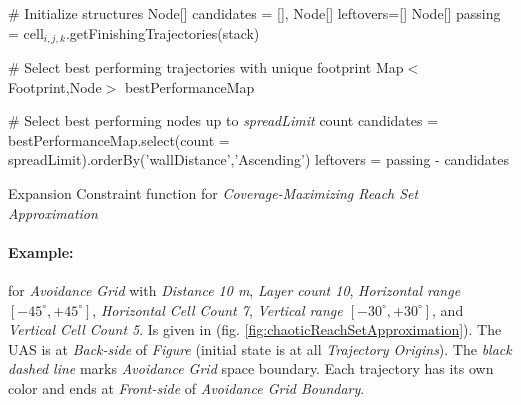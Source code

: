 \begin{algorithm}[H]
    
    \BlankLine
    \# Initialize structures\;
    Node[] candidates = [], Node[] leftovers=[]\;
    Node[] passing = cell$_{i,j,k}$.getFinishingTrajectories(stack)\;
    
    \BlankLine
    \# Select best performing trajectories with unique footprint\;
    Map$<$Footprint,Node$>$  bestPerformanceMap\;
    \For{Node test $\in$ passing}{
        wallDistance= test.minimalDistanceToWall(cell$_{i,j,k}$)]\;
        footPrint = test.getFootprint(lastCells = footprintLength)\;
        \eIf{bestPerformanceMap.contains(footPrint)}{
            old = bestPerformanceMap.getByKey(footprint)\;
            oldPerformance= old.minimalDistanceToWall(cell$_{i,j,k}$)\;
            \If{oldPerformance $>$ wallDistance}{
                bestPerformanceMap.setByKey(footprint,test)\;         
            }
        }{
            bestPerformanceMap.setByKey(footprint,test)\;
        }
    }
    
    \BlankLine
    \# Select best performing nodes up to \emph{spreadLimit} count\;
    candidates = bestPerformanceMap.select(count = spreadLimit).orderBy('wallDistance','Ascending')\;
    leftovers = passing - candidates\;
    
    
    \caption{Expansion Constraint function for \emph{Coverage-Maximizing Reach Set Approximation}}
    \label{alg:ExpansionConstraintFunctionForChaoticReachSet}
\end{algorithm}

\newpage
\paragraph{Example:} for \emph{Avoidance Grid} with \emph{Distance 10 m}, \emph{Layer count 10}, \emph{Horizontal range $[-45^\circ,+45^\circ]$}, \emph{Horizontal Cell Count 7}, \emph{Vertical range $[-30^\circ,+30^\circ]$}, and \emph{Vertical Cell Count 5}. Is given in (fig. \ref{fig:chaoticReachSetApproximation}). The UAS is at \emph{Back-side} of \emph{Figure} (initial state is at all \emph{Trajectory Origins}). The \emph{black dashed line} marks \emph{Avoidance Grid} space boundary. Each trajectory has its own color and ends at \emph{Front-side} of \emph{Avoidance Grid Boundary}.

